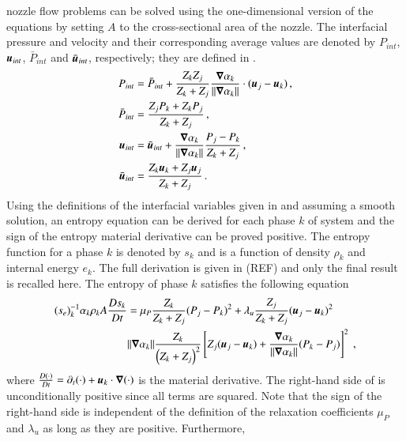 \documentclass[preprint,10pt]{elsarticle}
\begin{document}
nozzle flow problems can be solved using the one-dimensional version of the equations by setting $A$ to the cross-sectional area 
of the nozzle. The interfacial pressure and velocity and their corresponding average values are denoted by $P_{int}$, $\boldsymbol u_{int}$, 
$\bar{P}_{int}$ and $\bar{\boldsymbol u}_{int}$, respectively; they are defined in .
%
\begin{subequations}
\label{eq:int_variables_def}
\begin{align}
  \label{E-R:83}
  P_{int} &= \bar{P}_{int} + \frac{Z_{k}Z_{j}}{Z_{k}+Z_{j}} \frac{\boldsymbol\nabla \alpha_{k}}{|| \boldsymbol\nabla \alpha_{k} ||} \cdot (\boldsymbol u_{j}-\boldsymbol u_{k}) \,,
  \\
  \bar{P}_{int} &= \frac{Z_{j}P_{k}+Z_{k}P_{j}}{Z_{k}+Z_{j}} \,,
 \\
  \label{E-R:84}
  \boldsymbol u_{int} &= \bar{\boldsymbol u}_{int} +  \frac{\boldsymbol\nabla \alpha_{k}}{|| \boldsymbol\nabla \alpha_{k} ||} \frac{P_{j}-P_{k}}{Z_{k}+Z_{j}} \,,
  \\
  \bar{\boldsymbol u}_{int} &= \frac{Z_{k} \boldsymbol u_{k}+Z_{j}\boldsymbol u_{j}}{Z_{k}+Z_{j}} \,.
\end{align}
\end{subequations}
%
Using the definitions of the interfacial variables given in  and assuming a smooth solution, an entropy equation can be derived for each phase $k$ of system  and the sign of the entropy material derivative can be proved positive. The entropy function for a phase $k$ is denoted by $s_k$ and is a function of 
density $\rho_k$ and internal energy $e_k$. The full derivation is given in (REF) and only the final result is recalled here. The entropy of phase $k$ satisfies the following equation
%
\begin{align} \label{eq:ent-eqn-7-eqn}
(s_{e})_k^{-1} \alpha_k \rho_k A \frac{Ds_k}{Dt} &= \mu_P \frac{Z_k}{Z_k+Z_j} (P_j - P_k)^2 + \lambda_u \frac{Z_j}{Z_k+Z_j} (\boldsymbol u_j -\boldsymbol u_k)^2 \nonumber
\\
& \| \boldsymbol\nabla \alpha_k \| \frac{Z_k}{\left( Z_k+Z_j \right)^2} \left[ Z_j (\boldsymbol u_j-\boldsymbol u_k)+\frac{\boldsymbol\nabla \alpha_k}{\| \boldsymbol\nabla \alpha_k \|}(P_k-P_j)\right]^2 \ ,
\end{align}
%
where $\frac{D(\cdot) }{Dt} = \partial_t (\cdot) + \boldsymbol u_k \cdot \boldsymbol\nabla (\cdot)$ is the material derivative.
The right-hand side of  is unconditionally positive since all terms are squared. Note that the sign of the right-hand side is independent of the definition of the relaxation coefficients $\mu_P$ and $\lambda_u$ as long as they are positive. Furthermore, 
\end{document}
